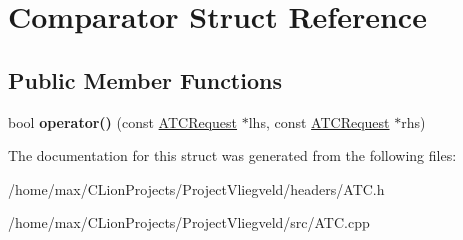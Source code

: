 \hypertarget{structComparator}{}\section{Comparator Struct Reference}
\label{structComparator}
\subsection*{Public Member Functions}
\begin{DoxyCompactItemize}
\item 
bool {\bfseries operator()} (const \hyperlink{structATCRequest}{A\+T\+C\+Request} $\ast$lhs, const \hyperlink{structATCRequest}{A\+T\+C\+Request} $\ast$rhs)\hypertarget{structComparator_a9c98d44444d191fe54f5f3a5838600b5}{}\label{structComparator_a9c98d44444d191fe54f5f3a5838600b5}

\end{DoxyCompactItemize}


The documentation for this struct was generated from the following files\+:\begin{DoxyCompactItemize}
\item 
/home/max/\+C\+Lion\+Projects/\+Project\+Vliegveld/headers/A\+T\+C.\+h\item 
/home/max/\+C\+Lion\+Projects/\+Project\+Vliegveld/src/A\+T\+C.\+cpp\end{DoxyCompactItemize}

